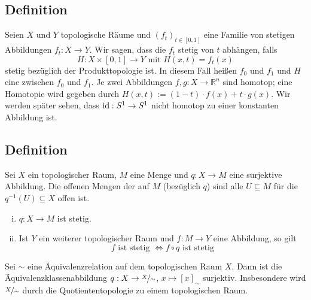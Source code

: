 \subsection[Definition: Homotopie und homotop]{Definition} %
\label{sub:28}
Seien $X$ und $Y$ topologische Räume und $(f_t)_{t \in [0,1]}$ eine Familie von stetigen Abbildungen $f_t : X \to Y$. Wir sagen, dass die $f_t$ stetig von $t$ abhängen,
falls 
\[
	H : X \times [0,1] \longrightarrow Y \text{ mit } H(x,t) = f_t(x)
\]
stetig bezüglich der Produkttopologie ist. In diesem Fall heißen $f_0$ und $f_1$  und $H$ eine  zwischen $f_0$ und $f_1$. 
Je zwei Abbildungen $f,g : X \to \mathds{R}^n$ sind homotop; eine Homotopie wird gegeben durch $H(x,t) := (1-t)\cdot f(x) + t \cdot g(x)$. Wir werden später sehen, dass 
$\operatorname{id} : S^1 \to S^1$ nicht homotop zu einer konstanten Abbildung ist.

\subsection[Definition: Quotiententopologie]{Definition} %
\label{sub:29}
Sei $X$ ein topologischer Raum, $M$ eine Menge und $q : X \to M$ eine surjektive Abbildung. Die offenen Mengen der  auf $M$ (bezüglich $q$) sind 
alle $U \subseteq M$ für die $q ^{-1} (U ) \subseteq X$ offen ist.
\begin{enumerate}[(i)]
	\item $q : X \to M$ ist stetig.
	\item Ist $Y$ ein weiterer topologischer Raum und $f : M \to Y$ eine Abbildung, so gilt 
	\[
		f \text{ ist stetig } \iff f \circ q \text{ ist stetig}
	\]
\end{enumerate}
Sei $\sim$ eine Äquivalenzrelation auf dem topologischen Raum $X$. Dann ist die Äquivalenzklassenabbildung $q : X \to \nicefrac{X}{\sim}$, $x \mapsto [x]_\sim$ surjektiv.
Insbesondere wird $\nicefrac{X}{\sim}$ durch die Quotiententopologie zu einem topologischen Raum.

